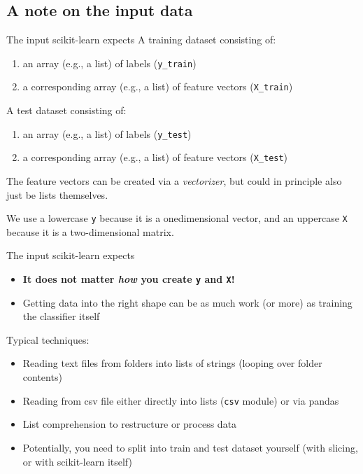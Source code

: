 \documentclass[compress]{beamer}
\begin{document}
\subsection{A note on the input data}

\begin{frame}{The input scikit-learn expects}
	A training dataset consisting of:
	\begin{enumerate}
		\item an array (e.g., a list) of labels (\texttt{y\_train})
		\item a corresponding array (e.g., a list) of feature vectors (\texttt{X\_train})
	\end{enumerate}
	
	A test dataset consisting of:
	\begin{enumerate}
		\item an array (e.g., a list) of labels (\texttt{y\_test})
		\item a corresponding array (e.g., a list) of feature vectors (\texttt{X\_test})
	\end{enumerate}
	
	The feature vectors can be created via a \textit{vectorizer}, but could in principle also just be lists themselves.
	
	We use a lowercase \texttt{y} because it is a onedimensional vector, and an uppercase \texttt{X} because it is a two-dimensional matrix.
\end{frame}


\begin{frame}{The input scikit-learn expects}
	\begin{itemize}
		\item \textbf{It does not matter \emph{how} you create \texttt{y} and \texttt{X}!}
		\item Getting data into the right shape can be as much work (or more) as training the classifier itself
	\end{itemize}
	\pause
	Typical techniques:
	\begin{itemize}
		\item Reading text files from folders into lists of strings (looping over folder contents)
		\item Reading from csv file either directly into lists (\texttt{csv} module) or via pandas
		\item List comprehension to restructure or process data
		\item Potentially, you need to split into train and test dataset yourself (with slicing, or  with scikit-learn itself)
	\end{itemize}
	
	
\end{frame}
\end{document}
